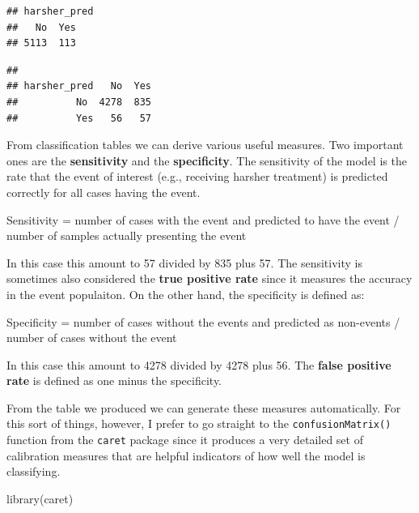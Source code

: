 \documentclass[
]{book}
\newenvironment{Shaded}{\begin{snugshade}}{\end{snugshade}}
\newcommand{\CommentTok}[1]{\textcolor[rgb]{0.56,0.35,0.01}{\textit{#1}}}
\newcommand{\FunctionTok}[1]{\textcolor[rgb]{0.00,0.00,0.00}{#1}}
\newcommand{\NormalTok}[1]{#1}
\newcommand{\OtherTok}[1]{\textcolor[rgb]{0.56,0.35,0.01}{#1}}
\newcommand{\SpecialCharTok}[1]{\textcolor[rgb]{0.00,0.00,0.00}{#1}}
\begin{document}
\begin{verbatim}
## harsher_pred
##   No  Yes 
## 5113  113
\end{verbatim}

\begin{Shaded}
\end{Shaded}

\begin{verbatim}
##             
## harsher_pred   No  Yes
##          No  4278  835
##          Yes   56   57
\end{verbatim}

From classification tables we can derive various useful measures. Two important ones are the \textbf{sensitivity} and the \textbf{specificity}. The sensitivity of the model is the rate that the event of interest (e.g., receiving harsher treatment) is predicted correctly for all cases having the event.

Sensitivity = number of cases with the event and predicted to have the event / number of samples actually presenting the event

In this case this amount to 57 divided by 835 plus 57. The sensitivity is sometimes also considered the \textbf{true positive rate} since it measures the accuracy in the event populaiton. On the other hand, the specificity is defined as:

Specificity = number of cases without the events and predicted as non-events / number of cases without the event

In this case this amount to 4278 divided by 4278 plus 56. The \textbf{false positive rate} is defined as one minus the specificity.

From the table we produced we can generate these measures automatically. For this sort of things, however, I prefer to go straight to the \texttt{confusionMatrix()} function from the \texttt{caret} package since it produces a very detailed set of calibration measures that are helpful indicators of how well the model is classifying.

\begin{Shaded}
\begin{Highlighting}[]
\FunctionTok{library}\NormalTok{(caret)}
\end{Highlighting}
\end{Shaded}
\end{document}
